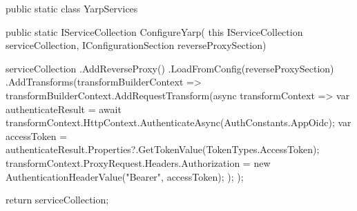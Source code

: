 \begin{spverbatim}
    public static class YarpServices
        {
        public static IServiceCollection ConfigureYarp(
        this IServiceCollection serviceCollection,
        IConfigurationSection reverseProxySection)
            {
            serviceCollection
            .AddReverseProxy()
            .LoadFromConfig(reverseProxySection)
            .AddTransforms(transformBuilderContext =>
                {
                transformBuilderContext.AddRequestTransform(async transformContext =>
                    {
                    var authenticateResult = await transformContext.HttpContext.AuthenticateAsync(AuthConstants.AppOidc);
                    var accessToken = authenticateResult.Properties?.GetTokenValue(TokenTypes.AccessToken);
                    transformContext.ProxyRequest.Headers.Authorization = new AuthenticationHeaderValue("Bearer", accessToken);
                });
            });

            return serviceCollection;
        }
    }
\end{spverbatim}